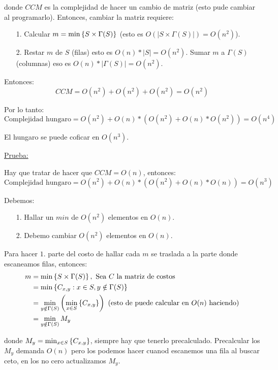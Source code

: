 \documentclass[12pt,a4paper]{article}
\begin{document}
donde $CCM$ es la complejidad de hacer un cambio de matriz (esto pude cambiar al programarlo).
Entonces, cambiar la matriz requiere:
\medskip

\begin{itemize}
    \item [1.] Calcular $m = \min \left\lbrace S \times \Gamma(S) \right\rbrace$ (esto es $O(|S \times \Gamma(S)|)=O(n^2)$).
    \item [2.] Restar $m$ de $S$ (filas) esto es $O(n)*|S| = O(n^2)$. Sumar $m$ a $\Gamma(S)$ (columnas) 
        eso es $O(n)*|\Gamma(S)| = O(n^2)$.
\end{itemize}
Entonces:
$$CCM = O(n^2) + O(n^2) + O(n^2) = O(n^2)$$

Por lo tanto:
$$\text{Complejidad hungaro} = O(n^{2}) + O(n)*(O(n^{2}) + O(n)*O(n^{2})) = O(n^{4})$$

\begin{teorema} El hungaro se puede coficar en $O(n^3)$.
\end{teorema}
\underline{Prueba:}
\medskip

Hay que tratar de hacer que $CCM = O(n)$, entonces:
$$\text{Complejidad hungaro} = O(n^{2}) + O(n)*(O(n^{2}) + O(n)*O(n)) = O(n^{3})$$

Debemos:
\begin{itemize}
    \item [1.] Hallar un $min$ de $O(n^{2})$ elementos en $O(n)$.
    \item [2.] Debemo cambiar $O(n^{2})$ elementos en $O(n)$.
\end{itemize}

Para hacer $1.$ parte del costo de hallar cada $m$ se traslada a la parte donde 
escaneamos filas, entonces:
\begin{align*}
    m &= \min \left\lbrace S \times \Gamma(S) \right\rbrace,\,\, \text{Sea $C$ la matriz de costos} \\
    &= \min \left\lbrace C_{x,y} : x \in S, y \notin \Gamma(S) \right\rbrace \\
    &= \min_{y\notin \Gamma(S)} \left(\min_{x\in S}\left\lbrace C_{x,y} \right\rbrace\right)\,\,(\text{esto de puede calcular en $O(n)$ haciendo})\\
    &= \min_{y \notin \Gamma(S)} M_{y} 
\end{align*}

donde $M_{y} = \min_{x\in S}\left\lbrace C_{x,y} \right\rbrace$, siempre hay que tenerlo precalculado. Precalcular 
los $M_{y}$ demanda $O(n)$ pero los podemos hacer cuanod escanemos una fila al buscar 
ceto, en los no cero actualizamos $M_{y}$.
\medskip
\end{document}
